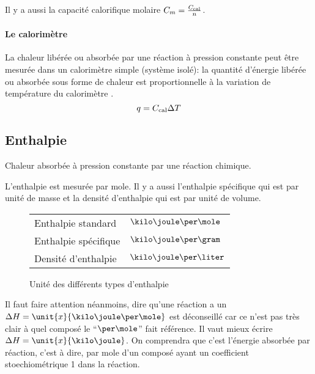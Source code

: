 Il y a aussi la capacité calorifique molaire $C_m = \frac{C_\mathrm{cal}}{n}$.


\paragraph{Le calorimètre}
La chaleur libérée ou absorbée par une réaction à pression constante peut être mesurée dans un calorimètre simple (système isolé): la quantité d'énergie libérée ou absorbée sous forme de chaleur est proportionnelle à la variation de température du calorimètre \cite[pp.~16,17]{legras}.
$$q=C_\mathrm{cal} \Delta T$$

\subsection{Enthalpie} \label{sec:DH}
Chaleur absorbée à pression constante par une réaction chimique.

L'enthalpie est mesurée par mole.
Il y a aussi l'enthalpie spécifique qui est par unité de masse et la densité d'enthalpie qui est par unité de volume.

\begin{figure}[h!]
  \begin{center}
    \begin{tabular}{|ll|}
      \hline
      Enthalpie standard & $\kilo\joule\per\mole$\\
      Enthalpie spécifique & $\kilo\joule\per\gram$\\
      Densité d'enthalpie & $\kilo\joule\per\liter$\\
      \hline
    \end{tabular}
  \end{center}
  \label{fig:enthunit}
  \caption{Unité des différents types d'enthalpie}
\end{figure}

Il faut faire attention néanmoins,
dire qu'une réaction a un $\Delta H = \unit{x}{\kilo\joule\per\mole}$ est déconseillé car ce n'est pas très clair à quel composé le ``$\per\mole$'' fait référence.
Il vaut mieux écrire $\Delta H = \unit{x}{\kilo\joule}$.
On comprendra que c'est l'énergie absorbée par réaction,
c'est à dire,
par mole d'un composé ayant un coefficient stoechiométrique 1 dans la réaction.

